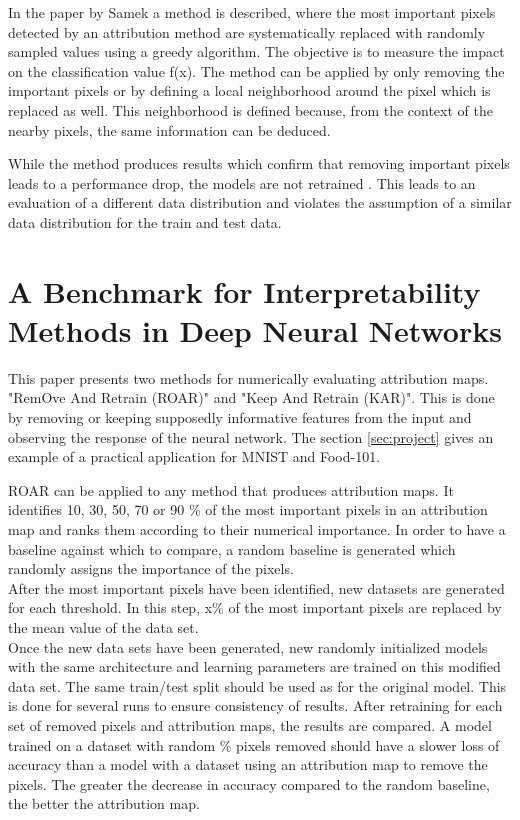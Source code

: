 In the paper by Samek\cite{samek2017} a method is described, where the most important pixels detected by an attribution method are systematically replaced with randomly sampled values using a greedy algorithm. The objective is to measure the impact on the classification value f(x). The method can be applied by only removing the important pixels or by defining a local neighborhood around the pixel which is replaced as well. This neighborhood is defined because, from the context of the nearby pixels, the same information can be deduced.

While the method produces results which confirm that removing important pixels leads to a performance drop, the models are not retrained \cite{hooker2019benchmark}. This leads to an evaluation of a different data distribution and violates the assumption of a similar data distribution for the train and test data.

\section{A Benchmark for Interpretability Methods in Deep Neural Networks }

This paper \cite{hooker2019benchmark} presents two methods for numerically evaluating attribution maps. "RemOve And Retrain (ROAR)" and "Keep And Retrain (KAR)". This is done by removing or keeping supposedly informative features from the input and observing the response of the neural network. The section \ref{sec:project} gives an example of a practical application for MNIST\cite{deng2012mnist} and Food-101\cite{bossard14}.

ROAR can be applied to any method that produces attribution maps. It identifies 10, 30, 50, 70 or 90 \% of the most important pixels in an attribution map and ranks them according to their numerical importance. In order to have a baseline against which to compare, a random baseline is generated which randomly assigns the importance of the pixels.\\ After the most important pixels have been identified, new datasets are generated for each threshold. In this step, x\% of the most important pixels are replaced by the mean value of the data set.\\
Once the new data sets have been generated, new randomly initialized models with the same architecture and learning parameters are trained on this modified data set. The same train/test split should be used as for the original model. This is done for several runs to ensure consistency of results.
After retraining for each set of removed pixels and attribution maps, the results are compared. A model trained on a dataset with random \% pixels removed should have a slower loss of accuracy than a model with a dataset using an attribution map to remove the pixels. The greater the decrease in accuracy compared to the random baseline, the better the attribution map.

